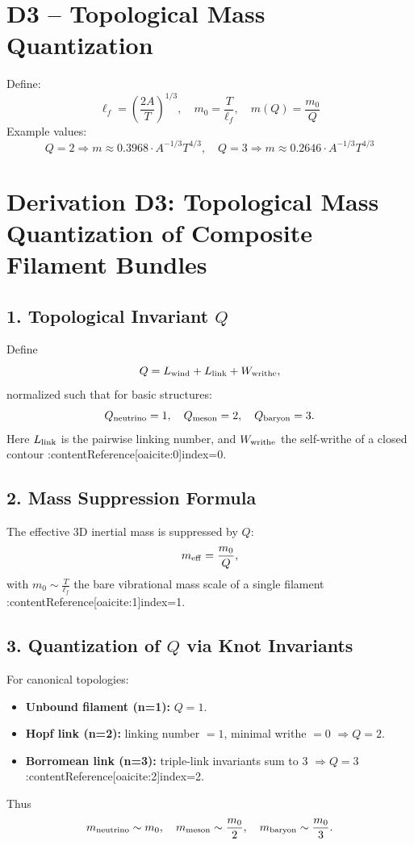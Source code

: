 \section*{D3 – Topological Mass Quantization}
Define:
\[
\ell_f = \left( \frac{2A}{T} \right)^{1/3}, \quad m_0 = \frac{T}{\ell_f}, \quad m(Q) = \frac{m_0}{Q}
\]
Example values:
\[
Q = 2 \Rightarrow m \approx 0.3968 \cdot A^{-1/3} T^{4/3}, \quad Q = 3 \Rightarrow m \approx 0.2646 \cdot A^{-1/3} T^{4/3}
\]


\section*{Derivation D3: Topological Mass Quantization of Composite Filament Bundles}
\subsection*{1. Topological Invariant \(Q\)}
Define
\[
Q = L_{\rm wind} + L_{\rm link} + W_{\rm writhe},
\]
normalized such that for basic structures:
\[
Q_{\rm neutrino}=1,\quad
Q_{\rm meson}=2,\quad
Q_{\rm baryon}=3.
\]
Here \(L_{\rm link}\) is the pairwise linking number, and \(W_{\rm writhe}\) the self-writhe of a closed contour :contentReference[oaicite:0]{index=0}.

\subsection*{2. Mass Suppression Formula}
The effective 3D inertial mass is suppressed by \(Q\):
\[
m_{\rm eff} = \frac{m_0}{Q},
\]
with \(m_0 \sim \frac{T}{\ell_f}\) the bare vibrational mass scale of a single filament :contentReference[oaicite:1]{index=1}.

\subsection*{3. Quantization of \(Q\) via Knot Invariants}
For canonical topologies:
\begin{itemize}
  \item \textbf{Unbound filament (n=1):} \(Q=1\).
  \item \textbf{Hopf link (n=2):} linking number \(=1\), minimal writhe \(=0\) \(\Rightarrow Q=2\).
  \item \textbf{Borromean link (n=3):} triple-link invariants sum to 3 \(\Rightarrow Q=3\) :contentReference[oaicite:2]{index=2}.
\end{itemize}
Thus
\[
m_{\rm neutrino}\sim m_0,\quad
m_{\rm meson}\sim \frac{m_0}{2},\quad
m_{\rm baryon}\sim \frac{m_0}{3}.
\]

